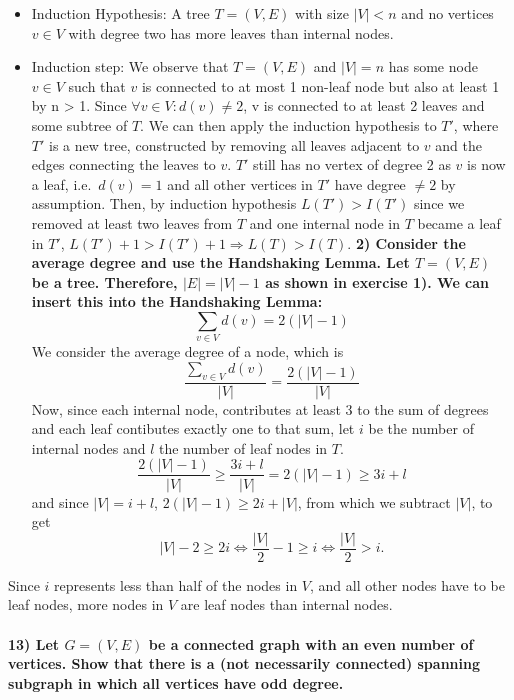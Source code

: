\documentclass[
]{article}
\providecommand{\tightlist}{%
  \setlength{\itemsep}{0pt}\setlength{\parskip}{0pt}}
\begin{document}
\begin{itemize}
\tightlist
\item
  Induction Hypothesis: A tree \(T=(V,E)\) with size \(|V| < n\) and no
  vertices \(v \in V\) with degree two has more leaves than internal
  nodes.
\item
  Induction step: We observe that \(T= (V,E)\) and \(|V| = n\) has some
  node \(v \in V\) such that \(v\) is connected to at most 1 non-leaf
  node but also at least 1 by n \textgreater{} 1. Since
  \(\forall v \in V: d(v) \neq 2\), v is connected to at least 2 leaves
  and some subtree of \(T\). We can then apply the induction hypothesis
  to \(T'\), where \(T'\) is a new tree, constructed by removing all
  leaves adjacent to \(v\) and the edges connecting the leaves to \(v\).
  \(T'\) still has no vertex of degree 2 as \(v\) is now a leaf,
  i.e.~\(d(v) = 1\) and all other vertices in \(T'\) have degree
  \(\neq 2\) by assumption. Then, by induction hypothesis
  \(L(T') > I (T')\) since we removed at least two leaves from \(T\) and
  one internal node in \(T\) became a leaf in \(T'\),
  \(L(T') + 1 > I(T') + 1 \Rightarrow L(T) > I(T)\). \textbf{2) Consider
  the average degree and use the Handshaking Lemma. Let \(T= (V,E)\) be
  a tree. Therefore, \(|E| = |V| - 1\) as shown in exercise 1). We can
  insert this into the Handshaking Lemma:} \[
  \sum_{v \in V} d(v) = 2 (|V| -1)
  \] We consider the average degree of a node, which is \[
  \frac{\sum_{v \in V} d(v)}{|V|} = \frac{2(|V|-1)}{|V|}
  \] Now, since each internal node, contributes at least 3 to the sum of
  degrees and each leaf contibutes exactly one to that sum, let \(i\) be
  the number of internal nodes and \(l\) the number of leaf nodes in
  \(T\). \[
  \frac{2(|V|-1)}{|V|} \geq \frac{3i+l}{|V|} = 2(|V|-1) \geq 3i+l
  \] and since \(|V| = i+l\), \(2(|V| -1) \geq 2i+|V|\), from which we
  subtract \(|V|\), to get
  \[|V| - 2\geq 2i \Leftrightarrow \frac{|V|}{2} - 1 \geq i \Leftrightarrow \frac{|V|}{2} > i.\]
\end{itemize}

Since \(i\) represents less than half of the nodes in \(V\), and all
other nodes have to be leaf nodes, more nodes in \(V\) are leaf nodes
than internal nodes.

\hypertarget{let-g-ve-be-a-connected-graph-with-an-even-number-of-vertices.-show-that-there-is-a-not-necessarily-connected-spanning-subgraph-in-which-all-vertices-have-odd-degree.}{%
\paragraph{\texorpdfstring{13) Let \(G = (V,E)\) be a connected graph
with an even number of vertices. Show that there is a (not necessarily
connected) spanning subgraph in which all vertices have odd
degree.}{13) Let G = (V,E) be a connected graph with an even number of vertices. Show that there is a (not necessarily connected) spanning subgraph in which all vertices have odd degree.}}\label{let-g-ve-be-a-connected-graph-with-an-even-number-of-vertices.-show-that-there-is-a-not-necessarily-connected-spanning-subgraph-in-which-all-vertices-have-odd-degree.}}
\end{document}
